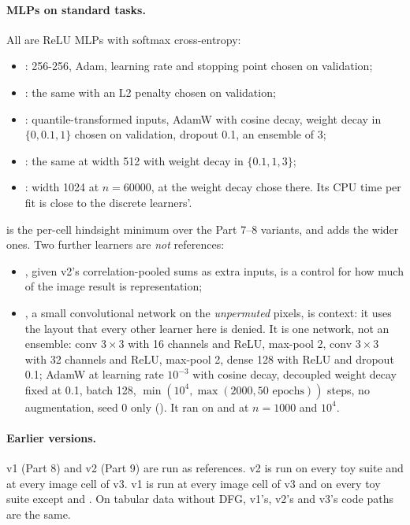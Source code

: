 \paragraph{MLPs on standard tasks.} All are ReLU MLPs with softmax cross-entropy:
\begin{itemize}
\item {}: 256-256, Adam, learning rate and stopping point chosen on validation;
\item {}: the same with an L2 penalty chosen on validation;
\item {}: quantile-transformed inputs, AdamW with cosine decay, weight decay in $\{0,0.1,1\}$ chosen on validation, dropout 0.1, an ensemble of 3;
\item {}: the same at width 512 with weight decay in $\{0.1,1,3\}$;
\item {}: width 1024 at $n=60000$, at the weight decay  chose there. Its CPU time per fit is close to the discrete learners'.
\end{itemize}
 is the per-cell hindsight minimum over the Part 7--8 variants, and  adds the wider ones. Two further learners are \emph{not} references:
\begin{itemize}
\item {},  given v2's correlation-pooled sums as extra inputs, is a control for how much of the image result is representation;
\item {}, a small convolutional network on the \emph{unpermuted} pixels, is context: it uses the layout that every other learner here is denied. It is one network, not an ensemble: conv $3\times3$ with 16 channels and ReLU, max-pool 2, conv $3\times3$ with 32 channels and ReLU, max-pool 2, dense 128 with ReLU and dropout 0.1; AdamW at learning rate $10^{-3}$ with cosine decay, decoupled weight decay fixed at 0.1, batch 128, $\min(10^4,\max(2000,\text{50 epochs}))$ steps, no augmentation, seed 0 only (). It ran on  and  at $n=1000$ and $10^4$.
\end{itemize}

\paragraph{Earlier versions.} v1 (Part 8) and v2 (Part 9) are run as references. v2 is run on every toy suite and at every image cell of v3. v1 is run at every image cell of v3 and on every toy suite except  and . On tabular data without DFG, v1's, v2's and v3's code paths are the same.

